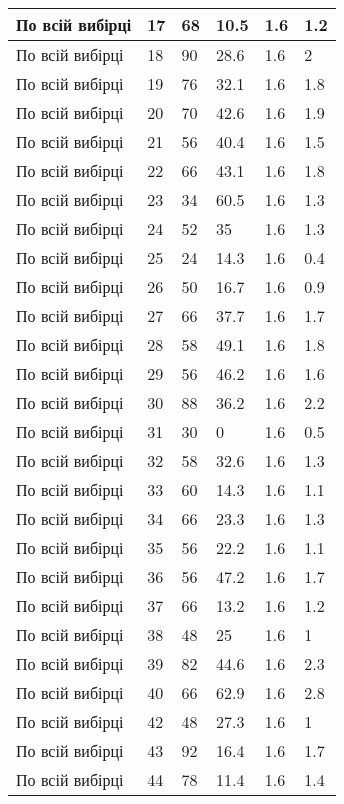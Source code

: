 \begin{longtable}[c]{ | p{2cm} | p{2cm} | p{2cm} | p{2cm} | p{3cm} | p{3cm} | }
	\hline
	По всій вибірці & 17 & 68 & 10.5 & 1.6 & 1.2 \\
	\hline
	По всій вибірці & 18 & 90 & 28.6 & 1.6 & 2 \\
	\hline
	По всій вибірці & 19 & 76 & 32.1 & 1.6 & 1.8 \\
	\hline
	По всій вибірці & 20 & 70 & 42.6 & 1.6 & 1.9 \\
	\hline
	По всій вибірці & 21 & 56 & 40.4 & 1.6 & 1.5 \\
	\hline
	По всій вибірці & 22 & 66 & 43.1 & 1.6 & 1.8 \\
	\hline
	По всій вибірці & 23 & 34 & 60.5 & 1.6 & 1.3 \\
	\hline
	По всій вибірці & 24 & 52 & 35 & 1.6 & 1.3 \\
	\hline
	По всій вибірці & 25 & 24 & 14.3 & 1.6 & 0.4 \\
	\hline
	По всій вибірці & 26 & 50 & 16.7 & 1.6 & 0.9 \\
	\hline
	По всій вибірці & 27 & 66 & 37.7 & 1.6 & 1.7 \\
	\hline
	По всій вибірці & 28 & 58 & 49.1 & 1.6 & 1.8 \\
	\hline
	По всій вибірці & 29 & 56 & 46.2 & 1.6 & 1.6 \\
	\hline
	По всій вибірці & 30 & 88 & 36.2 & 1.6 & 2.2 \\
	\hline
	По всій вибірці & 31 & 30 & 0 & 1.6 & 0.5 \\
	\hline
	По всій вибірці & 32 & 58 & 32.6 & 1.6 & 1.3 \\
	\hline
	По всій вибірці & 33 & 60 & 14.3 & 1.6 & 1.1 \\
	\hline
	По всій вибірці & 34 & 66 & 23.3 & 1.6 & 1.3 \\
	\hline
	По всій вибірці & 35 & 56 & 22.2 & 1.6 & 1.1 \\
	\hline
	По всій вибірці & 36 & 56 & 47.2 & 1.6 & 1.7 \\
	\hline
	По всій вибірці & 37 & 66 & 13.2 & 1.6 & 1.2 \\
	\hline
	По всій вибірці & 38 & 48 & 25 & 1.6 & 1 \\
	\hline
	По всій вибірці & 39 & 82 & 44.6 & 1.6 & 2.3 \\
	\hline
	По всій вибірці & 40 & 66 & 62.9 & 1.6 & 2.8 \\
	\hline
	По всій вибірці & 42 & 48 & 27.3 & 1.6 & 1 \\
	\hline
	По всій вибірці & 43 & 92 & 16.4 & 1.6 & 1.7 \\
	\hline
	По всій вибірці & 44 & 78 & 11.4 & 1.6 & 1.4 \\

\end{longtable}

